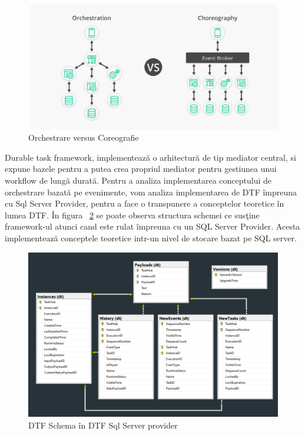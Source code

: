 \begin{figure}[h]
\begin{center}
        \includegraphics[width=1\textwidth]{images/Orchestration-VS-Choreography}
			 \caption{Orchestrare versus Coreografie}
			 \label{fig:orch_vs_coreografie}
\end{center}
\end{figure}

\par Durable task framework, implementează o arhitectură de tip mediator central, si expune bazele pentru a putea crea propriul mediator pentru gestiunea unui workflow de lungă durată. Pentru a analiza implementarea conceptului de orchestrare bazată pe evenimente, vom analiza implementarea de DTF împreuna cu Sql Server Provider, pentru a face o transpunere a conceptelor teoretice în lumea DTF. În figura ~\ref{fig:sql-server-provider} se poate observa structura schemei ce susţine framework-ul atunci cand este rulat împreuna cu un SQL Server Provider. Acesta implementează conceptele teoretice intr-un nivel de stocare bazat pe SQL server. 
 
 \begin{figure}[h]
\begin{center}
        \includegraphics[width=1\textwidth]{images/sql-server-provider}
			 \caption{DTF Schema în DTF Sql Server provider}
			 \label{fig:sql-server-provider}
\end{center}
\end{figure}

